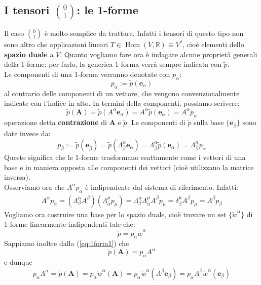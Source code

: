\documentclass[a4paper,11pt]{book}
\theoremstyle{plain}
\theoremstyle{definition}
\DeclareMathOperator*{\Hom}{Hom}
\begin{document}
\subsection{I tensori $\binom{0}{1}$: le 1-forme}
Il caso $\binom{0}{1}$ è molto semplice da trattare. Infatti i tensori di questo tipo non sono altro che applicazioni lineari $T\in\Hom(V,\mathbb{R})\equiv V^*$, cioè elementi dello \textbf{spazio duale} a $V$. Quanto vogliamo fare ora è indagare alcune proprietà generali della 1-forme: per farlo, la generica 1-forma verrà sempre indicata con $\tilde{p}$. 
\\
Le componenti di una 1-forma verranno denotate con $p_{\alpha}$:
\[
p_{\alpha}:= \tilde{p}(\textbf{e}_{\alpha})
\]
al contrario delle componenti di un vettore, che vengono convenzionalmente indicate con l'indice in alto. In termini della componenti, possiamo scrivere:
\begin{equation}\label{eq:1form1}
\tilde{p}(\textbf{A})=\tilde{p}(A^{\alpha}\textbf{e}_{\alpha})=A^{\alpha}\tilde{p}(\textbf{e}_{\alpha})=A^{\alpha}p_{\alpha}
\end{equation}
operazione detta \textbf{contrazione} di $\textbf{A}$ e $\tilde{p}$. Le componenti di $\tilde{p}$ sulla base $\{ \textbf{e}_{\overline{\beta}} \}$ sono date invece da:
\[
p_{\overline{\beta}}:=\tilde{p}(\textbf{e}_{\overline{\beta}})=\tilde{p}(\Lambda_{\overline{\beta}}^{\alpha}\textbf{e}_{\alpha}) = \Lambda_{\overline{\beta}}^{\alpha}\tilde{p}(\textbf{e}_{\alpha})=\Lambda_{\overline{\beta}}^{\alpha}p_{\alpha}
\]
Questo significa che le 1-forme trasformano esattamente come i vettori di una base e in maniera opposta alle componenti dei vettori (cioè utilizzano la matrice inversa). \\
Osserviamo ora che $A^{\alpha}p_{\alpha}$ è indipendente dal sistema di riferimento. Infatti:
\begin{align*}
A^{\overline{\alpha}}p_{\overline{\alpha}}=(\Lambda_{\beta}^{\overline{\alpha}} A^{\beta})(\Lambda_{\overline{\alpha}}^{\mu}p_{\mu})= \Lambda_{\beta}^{\overline{\alpha}}\Lambda_{\overline{\alpha}}^{\mu} A^{\beta}p_{\mu}= \delta _{\beta}^{\mu}A^{\beta}p_{\mu} = A^{\beta}p_{\beta}
\end{align*}
Vogliamo ora costruire una base per lo spazio duale, cioè trovare un set $\{ \tilde{w}^{\alpha} \}$ di 1-forme linearmente indipendenti tale che:
\[
\tilde{p}=p_{\alpha}\tilde{w}^{\alpha}
\]
Sappiamo inoltre dalla (\ref{eq:1form1}) che 
\[
\tilde{p}(\textbf{A})=p_{\alpha}A^{\alpha}
\]
e dunque
\[
p_{\alpha}A^{\alpha}= \tilde{p}(\textbf{A}) = p_{\alpha}\tilde{w}^{\alpha}(\textbf{A})=p_{\alpha}\tilde{w}^{\alpha}(A^{\beta}\textbf{e}_{\beta})=p_{\alpha}A^{\beta}\tilde{w}^{\alpha}(\textbf{e}_{\beta})
\]
\end{document}
